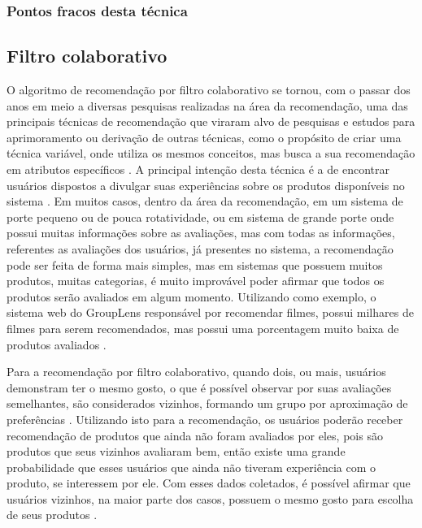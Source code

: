 \documentclass[12pt,
				openright,
				twoside,
				a4paper,
				apter=TITLE,
				section=TITLE,
				subsection=TITLE,
				chapter=TITLE,
				english,
				brazil]{abntex2}
\begin{document}
\subsubsection{Pontos fracos desta técnica}

\subsection{Filtro colaborativo}
O algoritmo de recomendação por filtro colaborativo se tornou, com o passar dos anos em meio a diversas pesquisas realizadas na área da recomendação, uma das principais técnicas de recomendação que viraram alvo de pesquisas e estudos para aprimoramento ou derivação de outras técnicas, como o propósito de criar uma técnica variável, onde utiliza os mesmos conceitos, mas busca a sua recomendação em atributos específicos \cite{asanov2011algorithms}. A principal intenção desta técnica é a de encontrar usuários dispostos a divulgar suas experiências sobre os produtos disponíveis no sistema \cite{linden2003amazon}. Em muitos casos, dentro da área da recomendação, em um sistema de porte pequeno ou de pouca rotatividade, ou em sistema de grande porte onde possui muitas informações sobre as avaliações, mas com todas as informações, referentes as avaliações dos usuários, já presentes no sistema, a recomendação pode ser feita de forma mais simples, mas em sistemas que possuem muitos produtos, muitas categorias, é muito improvável poder afirmar que todos os produtos serão avaliados em algum momento. Utilizando como exemplo, o sistema web do GroupLens responsável por recomendar filmes, possui milhares de filmes para serem recomendados, mas possui uma porcentagem muito baixa de produtos avaliados \cite{miller2003movielens}. 

Para a recomendação por filtro colaborativo, quando dois, ou mais, usuários demonstram ter o mesmo gosto, o que é possível observar por suas avaliações semelhantes, são considerados vizinhos, formando um grupo por aproximação de preferências \cite{asanov2011algorithms}. Utilizando isto para a recomendação, os usuários poderão receber recomendação de produtos que ainda não foram avaliados por eles, pois são produtos que seus vizinhos avaliaram bem, então existe uma grande probabilidade que esses usuários que ainda não tiveram experiência com o produto, se interessem por ele. Com esses dados coletados, é possível afirmar que usuários vizinhos, na maior parte dos casos, possuem o mesmo gosto para escolha de seus produtos \cite{miller2003movielens}.
\end{document}
